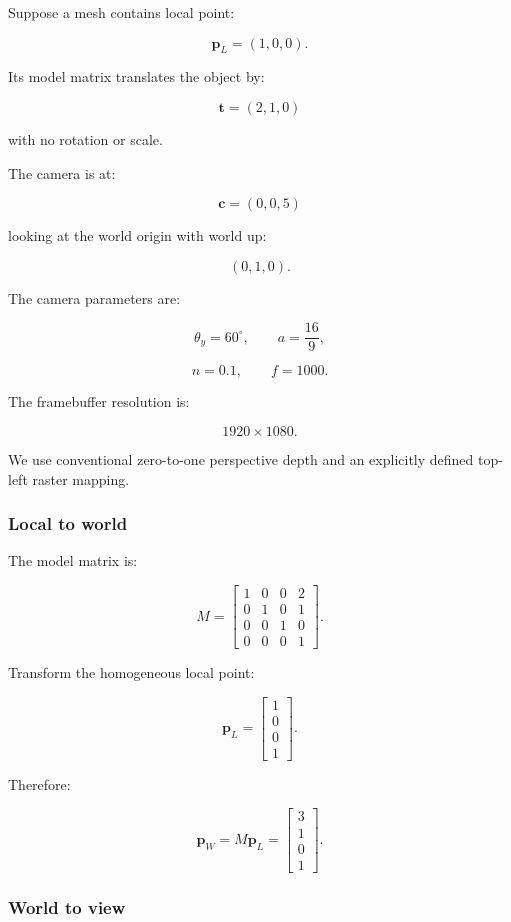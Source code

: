 Suppose a mesh contains local point:

\[
 \boxed{ \mathbf p_L=(1,0,0) }.
\]

Its model matrix translates the object by:

\[
 \mathbf t=(2,1,0)
\]

with no rotation or scale.

The camera is at:

\[
 \mathbf c=(0,0,5)
\]

looking at the world origin with world up:

\[
 (0,1,0).
\]

The camera parameters are:

\[
 \theta_y=60^\circ, \qquad a=\frac{16}{9},
\]

\[
 n=0.1,\qquad f=1000.
\]

The framebuffer resolution is:

\[
 1920\times1080.
\]

We use conventional zero-to-one perspective depth and an explicitly defined top-left raster mapping.

\subsubsection{Local to world}\label{02-foundations-ii-ch037-local-to-world}

The model matrix is:

\[
 M= \begin{bmatrix} 1&0&0&2\\ 0&1&0&1\\ 0&0&1&0\\ 0&0&0&1 \end{bmatrix}.
\]

Transform the homogeneous local point:

\[
 \mathbf p_L= \begin{bmatrix} 1\\0\\0\\1 \end{bmatrix}.
\]

Therefore:

\[
 \boxed{ \mathbf p_W= M\mathbf p_L= \begin{bmatrix} 3\\1\\0\\1 \end{bmatrix} }.
\]

\subsubsection{World to view}\label{02-foundations-ii-ch037-world-to-view}

